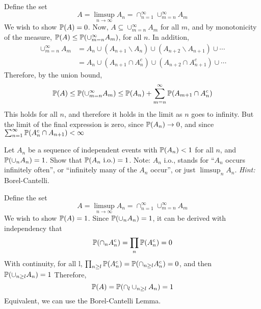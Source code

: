 \documentclass[a4paper, 12pt, answers]{exam}
\newcommand{\rai}{\rightarrow \infty}
\begin{document}
\begin{questions}
\begin{solution}
	Define the set
	\begin{equation*}
	A=\limsup_{n\rai}A_n=\cap_{n=1}^{\infty}\cup_{m=n}^{\infty}A_m
	\end{equation*}
	We wish to show $\operatorname{\mathbb{P}}(A)=0$. Now, $A\subseteq \cup_{m=n}^{\infty}A_m$ for all $m$, and by monotonicity of the measure, $\operatorname{\mathbb{P}}(A)\le\operatorname{\mathbb{P}}(\cup_{m=n}^{\infty} A_m)$, for all $n$. In addition,
	\begin{equation*}
	\begin{aligned}
	\cup_{m=n}^{\infty}A_m&=A_n\cup(A_{n+1}\backslash A_n)\cup(A_{n+2}\backslash A_{n+1})\cup\cdots\\
	&=A_n\cup(A_{n+1}\cap A_n^c)\cup(A_{n+2}\cap A_{n+1}^c)\cup\cdots
	\end{aligned}
	\end{equation*}
	Therefore, by the union bound,
	\begin{equation*}
	\operatorname{\mathbb{P}}(A)\le\operatorname{\mathbb{P}}(\cup_{m=n}^{\infty}A_m)\le\operatorname{\mathbb{P}}(A_n)+\sum_{m=n}^{\infty}\operatorname{\mathbb{P}}(A_{m+1}\cap A_n^c)
	\end{equation*}
	This holds for all $n$, and therefore it holds in the limit as $n$ goes to infinity. But the limit of the final expression is zero, since $\operatorname{\mathbb{P}}(A_n)\rightarrow 0$, and since $\sum_{n=1}^{\infty}\operatorname{\mathbb{P}}(A_n^c\cap A_{n+1})<\infty$
\end{solution}
\question Let $A_n$ be a sequence of independent events with $\operatorname{\mathbb{P}}(A_n) < 1$ for all $n$, and $\operatorname{\mathbb{P}}(\cup_n A_n)=1$. Show that $\operatorname{\mathbb{P}}(A_n \ \mathrm{i.o.})=1$. Note: $A_n$ i.o., stands for “$A_n$ occurs infinitely often”, or “infinitely many of the $A_n$ occur”, or just $\limsup_n A_n$. \emph{Hint:} Borel-Cantelli.
\begin{solution}
	Define the set
	\begin{equation*}
	A=\limsup_{n\rai}A_n=\cap_{n=1}^{\infty}\cup_{m=n}^{\infty}A_m
	\end{equation*}
	We wish to show $\operatorname{\mathbb{P}}(A)=1$. Since $\operatorname{\mathbb{P}}(\cup_n A_n)=1$, it can be derived with independency that
	\begin{equation*}
	\operatorname{\mathbb{P}}(\cap_nA_n^c)=\prod_{n}\operatorname{\mathbb{P}}(A_n^c)=0
	\end{equation*}
	With continuity, for all l, $\prod_{n\ge l}\operatorname{\mathbb{P}}(A_n^c)=\operatorname{\mathbb{P}}(\cap_{n\ge l}A_n^c)=0$, and then $\operatorname{\mathbb{P}}(\cup_{n\ge l}A_n)=1$
	Therefore, 
	\begin{equation*}
	\operatorname{\mathbb{P}}(A)=\operatorname{\mathbb{P}}(\cap_l\cup_{n\ge l}A_n)=1
	\end{equation*}
	Equivalent, we can use the Borel-Cantelli Lemma.
\end{solution}


\end{questions}
\end{document}
